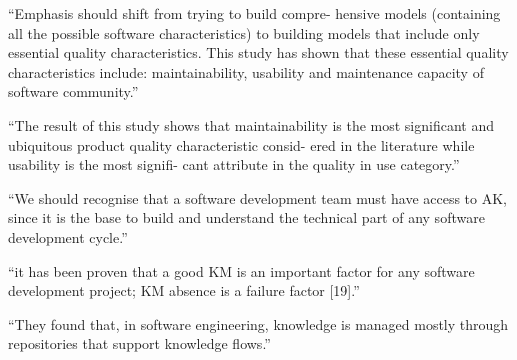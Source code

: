 \documentclass[12pt,letterpaper]{report}
\begin{document}
``Emphasis should shift from trying to build compre- hensive models (containing all the possible software characteristics) to building models that include only essential quality characteristics. This study has shown that these essential quality characteristics include: maintainability, usability and maintenance capacity of software community.'' \cite{adewumi:2016}

``The result of this study shows that maintainability is the most significant and ubiquitous product quality characteristic consid- ered in the literature while usability is the most signifi- cant attribute in the quality in use category.'' \cite{adewumi:2016}

``We should recognise that a software development team must have access to AK, since it is the base to build and understand the technical part of any software development cycle.'' \cite{borrego:2017}

``it has been proven that a good KM is an important factor for any software development project; KM absence is a failure factor [19].'' \cite{borrego:2017}


``They found that, in software engineering, knowledge is managed mostly through repositories that support knowledge flows.'' \cite{borrego:2017}



\newpage




\newpage







\newpage



\end{document}
